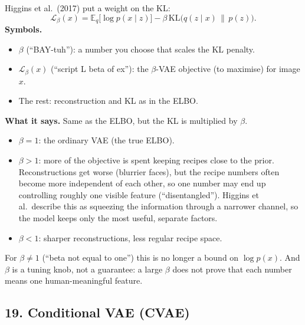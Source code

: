 Higgins et al.\ (2017) put a weight on the KL:
\[
\mathcal{L}_{\beta}(x) = \mathbb{E}_q\big[\log p(x \mid z)\big] - \beta\,\mathrm{KL}\big(q(z \mid x)\,\|\,p(z)\big).
\]
\textbf{Symbols.}
\begin{itemize}[leftmargin=1.5em, itemsep=0pt]
\item $\beta$ (``BAY-tuh''): a number you choose that scales the KL penalty.
\item $\mathcal{L}_{\beta}(x)$ (``script L beta of ex''): the $\beta$-VAE objective (to maximise) for image $x$.
\item The rest: reconstruction and KL as in the ELBO.
\end{itemize}
\textbf{What it says.} Same as the ELBO, but the KL is multiplied by $\beta$.
\begin{itemize}[leftmargin=1.5em]
\item $\beta = 1$: the ordinary VAE (the true ELBO).
\item $\beta > 1$: more of the objective is spent keeping recipes close to the prior. Reconstructions get worse (blurrier faces), but the recipe numbers often become more independent of each other, so one number may end up controlling roughly one visible feature (``disentangled''). Higgins et al.\ describe this as squeezing the information through a narrower channel, so the model keeps only the most useful, separate factors.
\item $\beta < 1$: sharper reconstructions, less regular recipe space.
\end{itemize}
For $\beta \ne 1$ (``beta not equal to one'') this is no longer a bound on $\log p(x)$. And $\beta$ is a tuning knob, not a guarantee: a large $\beta$ does not prove that each number means one human-meaningful feature.

\subsection*{19. Conditional VAE (CVAE)}

